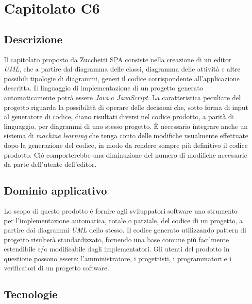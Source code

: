 \newpage
\section{Capitolato C6}

\subsection{Descrizione}

Il capitolato proposto da Zucchetti SPA consiste nella creazione di un editor \textit{UML}, che a partire dal diagramma delle classi, diagramma delle attività e altre possibili tipologie di diagrammi, generi il codice corrispondente all'applicazione descritta. Il linguaggio di implementazione di un progetto generato automaticamente potrà essere \textit{Java} o \textit{JavaScript}. La caratteristica peculiare del progetto riguarda la possibilità di operare delle decisioni che, sotto forma di input al generatore di codice, diano risultati diversi nel codice prodotto, a parità di linguaggio, per diagrammi di uno stesso progetto. {\MakeUppercase{è}} necessario integrare anche un sistema di \textit{machine learning} che tenga conto delle modifiche usualmente effettuate dopo la generazione del codice, in modo da rendere sempre più definitivo il codice prodotto. Ciò comporterebbe una diminuzione del numero di modifiche necessarie da parte dell'utente dell'editor.

\subsection{Dominio applicativo}

Lo scopo di questo prodotto è fornire agli sviluppatori software uno strumento per l'implementazione automatica, totale o parziale, del codice di un progetto, a partire dai diagrammi \textit{UML} dello stesso. Il codice generato utilizzando pattern di progetto risulterà standardizzato,
fornendo una base comune più facilmente estendibile e/o modificabile dagli implementatori. Gli utenti del prodotto in questione possono essere: l'amministratore, i progettisti, i programmatori e i verificatori di un progetto software.

\subsection{Tecnologie}

